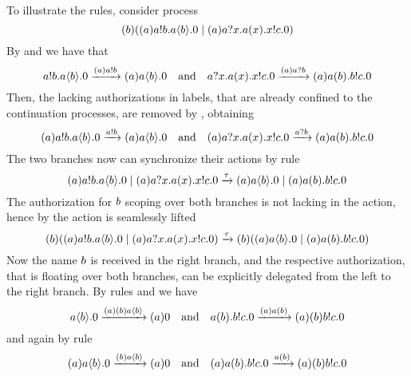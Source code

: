 To illustrate the rules, consider process 
\[
(b)((a)a!b.a\langle b\rangle.0 
\;|\; 
(a)a?x.a(x).x!c.0)
\]
By  and  we have that
\[
a!b.a\langle b\rangle.0
\xrightarrow{(a)a!b}
(a)a\langle b\rangle.0 
\quad \text{and}\quad
a?x.a(x).x!c.0
\xrightarrow{(a)a?b}
(a)a(b).b!c.0
\]
Then, the lacking authorizations in labels, that are already confined to the continuation processes, are removed by , obtaining
\[
(a)a!b.a\langle b\rangle.0
\xrightarrow{a!b}
(a)a\langle b\rangle.0 
\quad \text{and}\quad
(a)a?x.a(x).x!c.0
\xrightarrow{a?b}
(a)a(b).b!c.0
\]
The two branches now can synchronize their actions by rule 
\[
(a)a!b.a\langle b\rangle.0 
\;|\; 
(a)a?x.a(x).x!c.0
\xrightarrow{\tau}
(a)a\langle b\rangle.0 
\;|\; 
(a)a(b).b!c.0
\]
The authorization for $b$ scoping over both branches is not lacking in the action, hence by  the action is seamlessly lifted
\[
(b)((a)a!b.a\langle b\rangle.0 
\;|\; 
(a)a?x.a(x).x!c.0)
\xrightarrow{\tau}
(b)((a)a\langle b\rangle.0 
\;|\; 
(a)a(b).b!c.0)
\]
Now the name $b$ is received in the right branch, and the respective authorization, that is floating over both branches, can be explicitly delegated from the left to the right branch. By rules  and  we have 
\[
a\langle b\rangle.0
\xrightarrow{(a)(b)a\langle b\rangle}
(a)0 
\quad \text{and}\quad
a(b).b!c.0
\xrightarrow{(a)a(b)}
(a)(b)b!c.0
\]
and again by rule 
\[
(a)a\langle b\rangle.0
\xrightarrow{(b)a\langle b\rangle}
(a)0 
\quad \text{and}\quad
(a)a(b).b!c.0
\xrightarrow{a(b)}
(a)(b)b!c.0
\]
